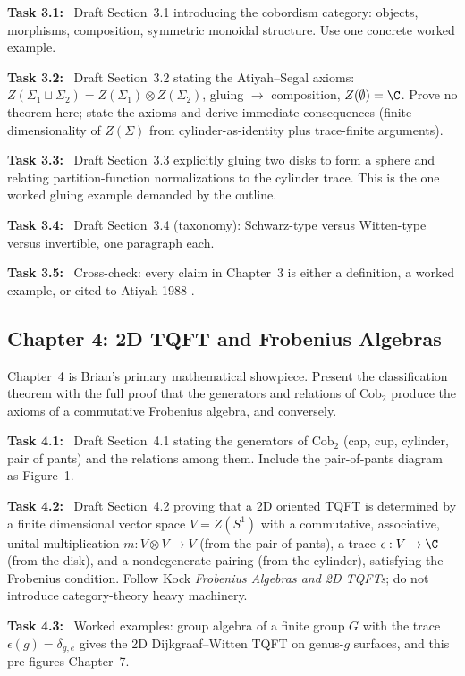 \documentclass[11pt]{article}
\newcommand{\task}[1]{\medskip\noindent\textbf{Task #1:}\ }
\begin{document}
\task{3.1} Draft Section~3.1 introducing the cobordism category: objects, morphisms,
composition, symmetric monoidal structure. Use one concrete worked example.

\task{3.2} Draft Section~3.2 stating the Atiyah--Segal axioms: $Z(\Sigma_1\sqcup\Sigma_2)=
Z(\Sigma_1)\otimes Z(\Sigma_2)$, gluing $\to$ composition, $Z(\emptyset)=\C$.
Prove no theorem here; state the axioms and derive immediate consequences (finite
dimensionality of $Z(\Sigma)$ from cylinder-as-identity plus trace-finite arguments).

\task{3.3} Draft Section~3.3 explicitly gluing two disks to form a sphere and relating
partition-function normalizations to the cylinder trace. This is the one worked gluing
example demanded by the outline.

\task{3.4} Draft Section~3.4 (taxonomy): Schwarz-type versus Witten-type versus
invertible, one paragraph each.

\task{3.5} Cross-check: every claim in Chapter~3 is either a definition, a worked
example, or cited to Atiyah 1988 \cite{Atiyah1988TQFT}.

\subsection{Chapter 4: 2D TQFT and Frobenius Algebras}

\begin{insight}[Showpiece]
Chapter~4 is Brian's primary mathematical showpiece. Present the classification theorem
with the full proof that the generators and relations of $\mathrm{Cob}_2$ produce the
axioms of a commutative Frobenius algebra, and conversely.
\end{insight}

\task{4.1} Draft Section~4.1 stating the generators of $\mathrm{Cob}_2$ (cap, cup,
cylinder, pair of pants) and the relations among them. Include the pair-of-pants diagram
as Figure~1.

\task{4.2} Draft Section~4.2 proving that a 2D oriented TQFT is determined by a finite
dimensional vector space $V=Z(S^1)$ with a commutative, associative, unital
multiplication $m:V\otimes V\to V$ (from the pair of pants), a trace $\epsilon:V\to\C$
(from the disk), and a nondegenerate pairing (from the cylinder), satisfying the
Frobenius condition. Follow Kock \emph{Frobenius Algebras and 2D TQFTs}; do not
introduce category-theory heavy machinery.

\task{4.3} Worked examples: group algebra of a finite group $G$ with the trace
$\epsilon(g)=\delta_{g,e}$ gives the 2D Dijkgraaf--Witten TQFT on genus-$g$
surfaces, and this pre-figures Chapter~7.
\end{document}
